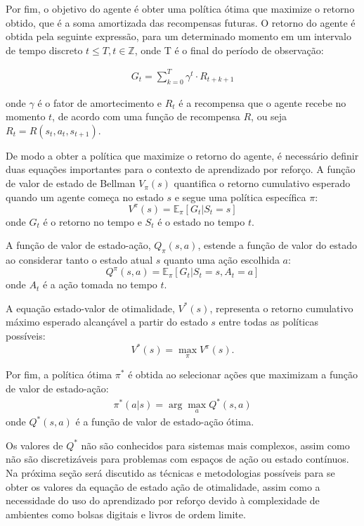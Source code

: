 Por fim, o objetivo do agente é obter uma política ótima que maximize o retorno obtido, que é a soma amortizada das recompensas futuras. O retorno do agente é obtida pela seguinte expressão, para um determinado momento em um intervalo de tempo discreto $t \leq T, t \in \mathbb{Z}$, onde T é o final do período de observação:

\begin{equation}
	\begin{aligned}
		G_{t} = \sum_{k=0}^{T} \gamma^t \cdot R_{t + k + 1}
	\end{aligned}
\end{equation}

onde $\gamma$ é o fator de amortecimento e $R_t$ é a recompensa que o agente recebe no momento $t$, de acordo com uma função de recompensa $R$, ou seja $R_t = R(s_{t}, a_{t}, s_{t + 1})$.

De modo a obter a política que maximize o retorno do agente, é necessário definir duas equações importantes para o contexto de aprendizado por reforço. A função de valor de estado de Bellman \(V_\pi(s)\) quantifica o retorno cumulativo esperado quando um agente começa no estado \(s\) e segue uma política específica \(\pi\):
\[ 
V^{\pi}(s) = \mathbb{E}_\pi[G_t | S_t = s]
\]
onde \(G_t\) é o retorno no tempo e \(S_t\) é o estado no tempo \(t\).

A função de valor de estado-ação, \(Q_\pi(s, a)\), estende a função de valor do estado ao considerar tanto o estado atual \(s\) quanto uma ação escolhida \(a\):
\[ Q^{\pi}(s, a) = \mathbb{E}_\pi[G_t | S_t = s, A_t = a]\]
onde \(A_t\) é a ação tomada no tempo \(t\).

A equação estado-valor de otimalidade, \(V^*(s)\), representa o retorno cumulativo máximo esperado alcançável a partir do estado \(s\) entre todas as políticas possíveis:
\[ V^*(s) = \max_\pi V^{\pi}(s). \]

Por fim, a política ótima $\pi^*$ é obtida ao selecionar ações que maximizam a função de valor de estado-ação:
\begin{equation}
	\begin{aligned}
		\pi^*(a|s) = \arg\max_a Q^*(s, a)
		\label{eq:objective}
	\end{aligned}
\end{equation}
onde \(Q^*(s, a)\) é a função de valor de estado-ação ótima.

Os valores de $Q^{*}$ não são conhecidos para sistemas mais complexos, assim como não são discretizáveis para problemas com espaços de ação ou estado contínuos. Na próxima seção será discutido as técnicas e metodologias possíveis para se obter os valores da equação de estado ação de otimalidade, assim como a necessidade do uso do aprendizado por reforço devido à complexidade de ambientes como bolsas digitais e livros de ordem limite.

